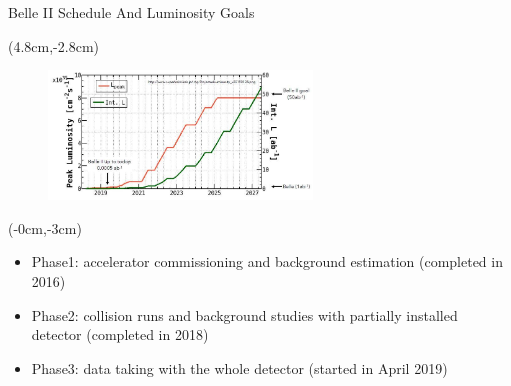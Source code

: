 \documentclass[8pt]{beamer}
\begin{document}
\begin{frame}{Belle II Schedule And Luminosity Goals}

	\begin{textblock*}{7cm}(4.8cm,-2.8cm)
	\begin{figure}
		\includegraphics[width=7cm]{VBilder/Lumen}
	\end{figure}
	
	
\end{textblock*}






	
	\begin{textblock*}{5cm}(-0cm,-3cm)
		\begin{center}	
			\begin{itemize}
				\item Phase1: accelerator commissioning and background estimation (completed in 2016)
				\item Phase2: collision runs and background studies with partially installed detector (completed in 2018)
				\item Phase3: data taking with the whole detector (started in April 2019)
			\end{itemize}
		\end{center}
		
	\end{textblock*}
	

	
	
	
	
\end{frame}
\end{document}
